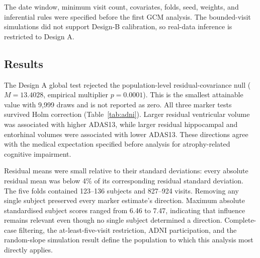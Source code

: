 \documentclass[11pt]{article}
\theoremstyle{definition}
\begin{document}
The date window, minimum visit count, covariates, folds, seed, weights, and inferential rules
were specified before the first GCM analysis. The bounded-visit simulations did not support
Design-B calibration, so real-data inference is restricted to Design A.

\subsection{Results}

The Design A global test rejected the population-level residual-covariance null
($M=13.4028$, empirical multiplier $p=0.0001$). This is the smallest attainable value with
9,999 draws and is not reported as zero. All three marker tests survived Holm correction
(Table~\ref{tab:adni}). Larger residual ventricular volume was associated with higher
ADAS13, while larger residual hippocampal and entorhinal volumes were associated with lower
ADAS13. These directions agree with the medical expectation specified before analysis for
atrophy-related cognitive impairment.

\begin{table}[!ht]
\centering
\caption{MRI--ADAS13 Design A results in 647 ADNI participants. Normalised
covariances divide the raw equal-subject residual covariance by the two corresponding
residual standard deviations. Intervals use the marker-level standard error and a normal
approximation; these quantities are descriptive rather than pre-specified effect sizes.}
\label{tab:adni}
\end{table}

Residual means were small relative to their standard deviations: every absolute residual
mean was below 4\% of its corresponding residual standard deviation. The five folds contained
123--136 subjects and 827--924 visits. Removing any single subject preserved every marker
estimate's direction. Maximum absolute standardised subject scores ranged from 6.46 to 7.47,
indicating that influence remains relevant even though no single subject determined a direction.
Complete-case filtering, the at-least-five-visit restriction, ADNI participation, and the
random-slope simulation result define the population to which this analysis most directly applies.
\end{document}
